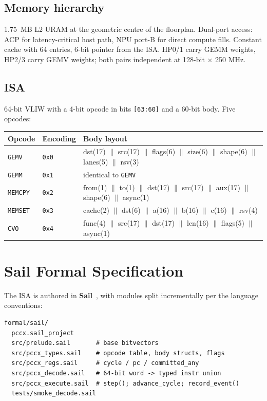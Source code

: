 \documentclass[11pt,a4paper]{article}
\begin{document}
\subsection{Memory hierarchy}

1.75~MB L2 URAM at the geometric centre of the floorplan.  Dual-port
access: ACP for latency-critical host path, NPU port-B for direct
compute fills.  Constant cache with 64 entries, 6-bit pointer from
the ISA.  HP0/1 carry GEMM weights, HP2/3 carry GEMV weights; both
pairs independent at 128-bit $\times$ 250 MHz.

\subsection{ISA}

64-bit VLIW with a 4-bit opcode in bits \texttt{[63:60]} and a 60-bit
body.  Five opcodes:

\begin{center}
\begin{tabular}{llp{}}
\toprule
Opcode   & Encoding & Body layout \\
\midrule
\texttt{GEMV}   & \texttt{0x0} & dst(17) $\|$ src(17) $\|$ flags(6) $\|$ size(6) $\|$ shape(6) $\|$ lanes(5) $\|$ rsv(3) \\
\texttt{GEMM}   & \texttt{0x1} & identical to \texttt{GEMV}  \\
\texttt{MEMCPY} & \texttt{0x2} & from(1) $\|$ to(1) $\|$ dst(17) $\|$ src(17) $\|$ aux(17) $\|$ shape(6) $\|$ async(1) \\
\texttt{MEMSET} & \texttt{0x3} & cache(2) $\|$ dst(6) $\|$ a(16) $\|$ b(16) $\|$ c(16) $\|$ rsv(4) \\
\texttt{CVO}    & \texttt{0x4} & func(4) $\|$ src(17) $\|$ dst(17) $\|$ len(16) $\|$ flags(5) $\|$ async(1) \\
\bottomrule
\end{tabular}
\end{center}

\section{Sail Formal Specification}
\label{sec:sail}

The ISA is authored in \textbf{Sail}~\cite{armstrong2019isa}, with
modules split incrementally per the language conventions:

\begin{lstlisting}[language={}]
formal/sail/
  pccx.sail_project
  src/prelude.sail       # base bitvectors
  src/pccx_types.sail    # opcode table, body structs, flags
  src/pccx_regs.sail     # cycle / pc / committed_any
  src/pccx_decode.sail   # 64-bit word -> typed instr union
  src/pccx_execute.sail  # step(); advance_cycle; record_event()
  tests/smoke_decode.sail
\end{lstlisting}
\end{document}
